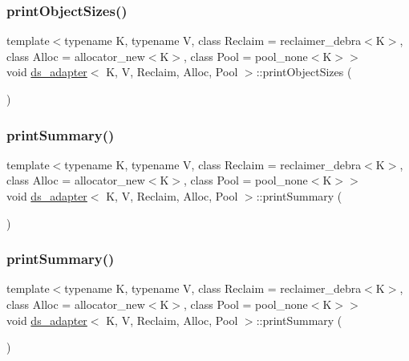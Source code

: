 \subsubsection{\texorpdfstring{print\+Object\+Sizes()}{printObjectSizes()}\hspace{0.1cm}{\footnotesize\ttfamily [26/26]}}
{\footnotesize\ttfamily template$<$typename K, typename V, class Reclaim = reclaimer\+\_\+debra$<$\+K$>$, class Alloc = allocator\+\_\+new$<$\+K$>$, class Pool = pool\+\_\+none$<$\+K$>$$>$ \\
void \hyperlink{classds__adapter}{ds\+\_\+adapter}$<$ K, V, Reclaim, Alloc, Pool $>$\+::print\+Object\+Sizes (\begin{DoxyParamCaption}{ }\end{DoxyParamCaption})\hspace{0.3cm}{\ttfamily [inline]}}

\mbox{\label{classds__adapter_aac97293215557665d2ef1e1a0d06fcfd}} 
\subsubsection{\texorpdfstring{print\+Summary()}{printSummary()}\hspace{0.1cm}{\footnotesize\ttfamily [1/26]}}
{\footnotesize\ttfamily template$<$typename K, typename V, class Reclaim = reclaimer\+\_\+debra$<$\+K$>$, class Alloc = allocator\+\_\+new$<$\+K$>$, class Pool = pool\+\_\+none$<$\+K$>$$>$ \\
void \hyperlink{classds__adapter}{ds\+\_\+adapter}$<$ K, V, Reclaim, Alloc, Pool $>$\+::print\+Summary (\begin{DoxyParamCaption}{ }\end{DoxyParamCaption})\hspace{0.3cm}{\ttfamily [inline]}}

\mbox{\label{classds__adapter_aac97293215557665d2ef1e1a0d06fcfd}} 
\subsubsection{\texorpdfstring{print\+Summary()}{printSummary()}\hspace{0.1cm}{\footnotesize\ttfamily [2/26]}}
{\footnotesize\ttfamily template$<$typename K, typename V, class Reclaim = reclaimer\+\_\+debra$<$\+K$>$, class Alloc = allocator\+\_\+new$<$\+K$>$, class Pool = pool\+\_\+none$<$\+K$>$$>$ \\
void \hyperlink{classds__adapter}{ds\+\_\+adapter}$<$ K, V, Reclaim, Alloc, Pool $>$\+::print\+Summary (\begin{DoxyParamCaption}{ }\end{DoxyParamCaption})\hspace{0.3cm}{\ttfamily [inline]}}

